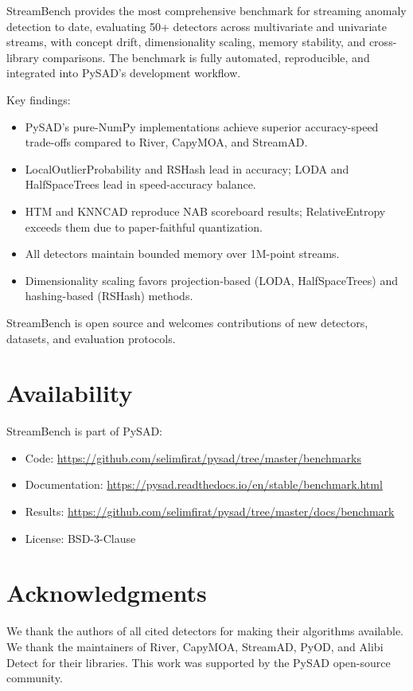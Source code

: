 \documentclass[11pt,a4paper]{article}
\begin{document}
StreamBench provides the most comprehensive benchmark for streaming anomaly detection to date, evaluating 50+ detectors across multivariate and univariate streams, with concept drift, dimensionality scaling, memory stability, and cross-library comparisons. The benchmark is fully automated, reproducible, and integrated into PySAD's development workflow.

Key findings:
\begin{itemize}
    \item PySAD's pure-NumPy implementations achieve superior accuracy-speed trade-offs compared to River, CapyMOA, and StreamAD.
    \item LocalOutlierProbability and RSHash lead in accuracy; LODA and HalfSpaceTrees lead in speed-accuracy balance.
    \item HTM and KNNCAD reproduce NAB scoreboard results; RelativeEntropy exceeds them due to paper-faithful quantization.
    \item All detectors maintain bounded memory over 1M-point streams.
    \item Dimensionality scaling favors projection-based (LODA, HalfSpaceTrees) and hashing-based (RSHash) methods.
\end{itemize}

StreamBench is open source and welcomes contributions of new detectors, datasets, and evaluation protocols.

\section*{Availability}

StreamBench is part of PySAD:
\begin{itemize}
    \item Code: \url{https://github.com/selimfirat/pysad/tree/master/benchmarks}
    \item Documentation: \url{https://pysad.readthedocs.io/en/stable/benchmark.html}
    \item Results: \url{https://github.com/selimfirat/pysad/tree/master/docs/benchmark}
    \item License: BSD-3-Clause
\end{itemize}

\section*{Acknowledgments}

We thank the authors of all cited detectors for making their algorithms available. We thank the maintainers of River, CapyMOA, StreamAD, PyOD, and Alibi Detect for their libraries. This work was supported by the PySAD open-source community.



\end{document}

